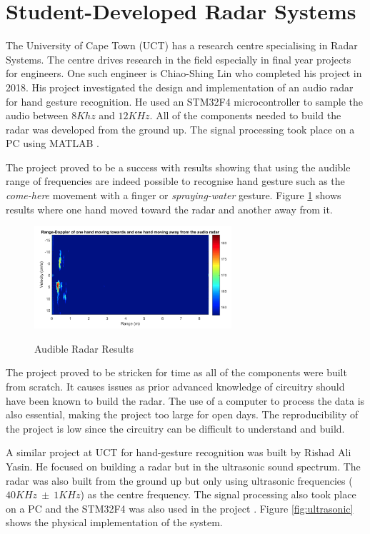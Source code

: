 \section{Student-Developed Radar Systems}

The University of Cape Town (UCT) has a research centre specialising in Radar Systems. The centre drives research in the field especially in final year projects for engineers. One such engineer is Chiao-Shing Lin who completed his project in 2018. His project investigated the design and implementation of an audio radar for hand gesture recognition. He used an STM32F4 microcontroller to sample the audio between $8Khz$ and $12KHz$. All of the components needed to build the radar was developed from the ground up. The signal processing took place on a PC using MATLAB \cite{lin_design_2018}. 

The project proved to be a success with results showing that using the audible range of frequencies are indeed possible to recognise hand gesture such as the \textit{come-here} movement with a finger or \textit{spraying-water} gesture. Figure \ref{fig:linResults} shows results where one hand moved toward the radar and another away from it.

\begin{figure}[h!]
    \centering
    \includegraphics[width = 0.65\textwidth]{images/handmoving.pdf}
    \caption{Audible Radar Results}\label{fig:linResults}\cite{lin_design_2018}
\end{figure}

The project proved to be stricken for time as all of the components were built from scratch. It causes issues as prior advanced knowledge of circuitry should have been known to build the radar. The use of a computer to process the data is also essential, making the project too large for open days. The reproducibility of the project is low since the circuitry can be difficult to understand and build. 

A similar project at UCT for hand-gesture recognition was built by Rishad Ali Yasin. He focused on building a radar but in the ultrasonic sound spectrum. The radar was also built from the ground up but only using ultrasonic frequencies ($40KHz\ \pm\ 1KHz$) as the centre frequency. The signal processing also took place on a PC and the STM32F4 was also used in the project \cite{ali_yasin_design_2018}. Figure \ref{fig:ultrasonic} shows the physical implementation of the system.

